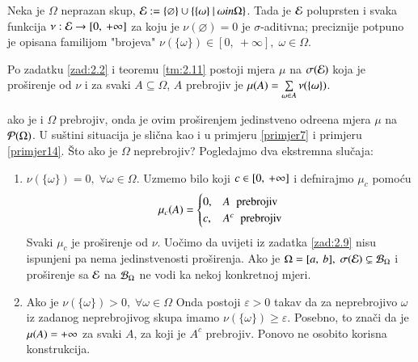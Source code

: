 \begin{nap} \label{nap:2.12}
    Neka je $\Omega$ neprazan skup, $\mathcal{E} := \{\varnothing\} \cup
    \{{\{ \omega \}} \: | \: {\omega in \Omega}\}$. Tada je $\mathcal{E}$
    poluprsten i svaka funkcija $\nu: \mathcal{E} \to [0, \: +\infty]$
    za koju je $\nu(\varnothing) = 0$ je $\sigma$-aditivna;
    preciznije potpuno je opisana familijom "brojeva"
    $\nu(\{ \omega \}) \in [0, \: +\infty], \; \omega \in \Omega$.

    Po zadatku \ref{zad:2.2} i teoremu \ref{tm:2.11} postoji mjera
    $\mu$ na $\sigma({\mathcal{E}})$ koja je pro\v sirenje od $\nu$ i za svaki
    $A \subseteq \Omega$, $A$ prebrojiv je $\mu({A})
    = \sum\limits_{\omega \in A}^{} \nu(\{ \omega \})$.

    ako je i $\Omega$ prebrojiv, onda je ovim pro\v sirenjem
    jedinstveno odre\dj ena mjera $\mu$ na $\mathcal{P}({\Omega})$.
    U su\v stini situacija je sli\v cna kao i u primjeru
    \ref{primjer7} i primjeru \ref{primjer14}.
    \v Sto ako je $\Omega$ neprebrojiv?
    Pogledajmo dva ekstremna slu\v caja:
    \begin{enumerate}[label=(\roman*)]
        \item $\nu(\{ \omega \}) = 0, \; \forall \omega \in \Omega$.
            Uzmemo bilo koji $c \in [{0}, \:{+\infty}]$ i defnirajmo
            $\mu_c$ pomo\' cu
            \begin{equation*}
                \mu_c(A) = 
                \begin{cases}
                    0, &A \;\; \textnormal{prebrojiv}\\
                    c, &A^c \;\; \textnormal{prebrojiv}
                \end{cases}
            \end{equation*}
            Svaki $\mu_c$ je pro\v sirenje od $\nu$. Uo\v cimo da
            uvijeti iz zadatka \ref{zad:2.9} nisu ispunjeni pa nema
            jedinstvenosti pro\v sirenja. Ako je $\Omega
            = [{a}, \:{b}], \; \sigma({\mathcal{E}})
            \subsetneq \mathcal{B}_{\Omega}$ i pro\v sirenje sa $\mathcal{E}$ na
            $\mathcal{B}_{\Omega}$ ne vodi ka nekoj konkretnoj mjeri.
        \item Ako je $\nu(\{\omega\}) > 0, \; \forall \omega \in
            \Omega$ Onda postoji $\varepsilon > 0$ takav da za
            neprebrojivo $\omega$ iz zadanog neprebrojivog skupa
            imamo $\nu(\{\omega\}) \geq \varepsilon$.
            Posebno, to zna\v ci da je $\mu({A}) = +\infty$ za svaki
            $A$, za koji je $A^c$ prebrojiv. Ponovo ne osobito
            korisna konstrukcija.
    \end{enumerate}
\end{nap}

